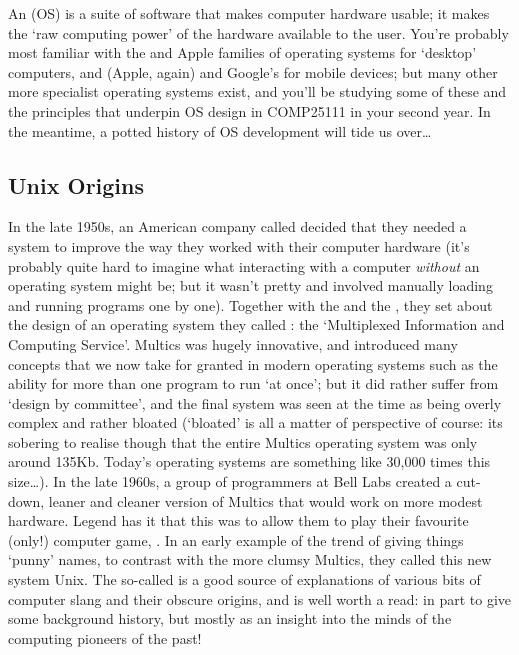 An  (OS) is a suite of
software that makes computer hardware usable; it makes the `raw
computing power' of the hardware available to the user. You're
probably most familiar with
the  and
Apple  families of operating systems for
`desktop' computers, and  (Apple, again) and
Google's  for mobile
devices; but many other more specialist operating systems exist, and
you'll be studying some of these and the principles that underpin OS
design in COMP25111 in your second year. In the meantime, a potted
history of OS development will tide us over\ldots
 
\subsection{Unix Origins}
\label{sec:unix}

In the late 1950s, an American company
called  decided that they
needed a system to improve the way they worked with their computer
hardware (it's probably quite hard to imagine what interacting with a
computer \emph{without} an operating system might be; but it wasn't
pretty and involved manually loading and running programs one by
one). Together with the  and the , they set about the design of an operating system they
called : the `Multiplexed Information and
Computing Service'. Multics was hugely innovative, and introduced many
concepts that we now take for granted in modern operating systems such
as the ability for more than one program to run `at once'; but it did
rather suffer from `design by committee', and the final system was
seen at the time as being overly complex and rather bloated (`bloated'
is all a matter of perspective of course: its sobering to realise
though that the entire Multics operating system was only around
135Kb. Today's operating systems are something like 30,000 times this
size\ldots). In the late 1960s, a group of programmers at Bell Labs
created a cut-down, leaner and cleaner version of Multics that would
work on more modest hardware. Legend has it that this was to allow
them to play their favourite (only!) computer
game, . In an early
example of the trend of giving things `punny' names, to contrast with
the more clumsy Multics, they called this new system Unix. The
so-called  is a good source of
explanations of various bits of computer slang and their obscure
origins, and is well worth a read: in part to give some background
history, but mostly as an insight into the minds of the computing
pioneers of the past!

